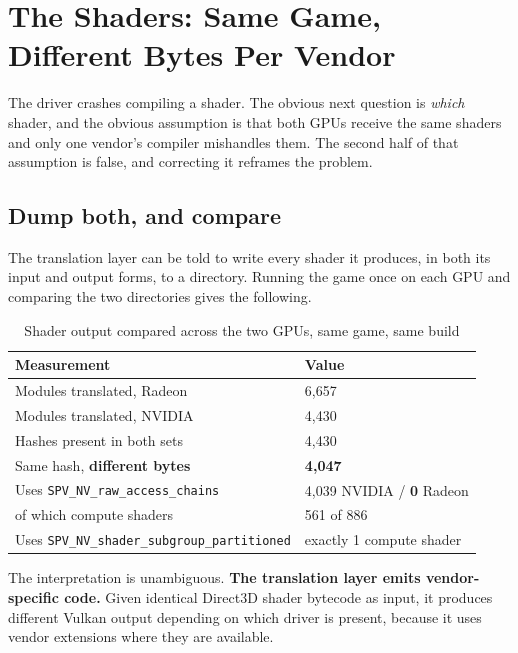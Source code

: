 \section{The Shaders: Same Game, Different Bytes Per Vendor}
\label{sec:shaders}

The driver crashes compiling a shader. The obvious next question is \emph{which}
shader, and the obvious assumption is that both GPUs receive the same shaders and
only one vendor's compiler mishandles them. The second half of that assumption is
false, and correcting it reframes the problem.

\subsection{Dump both, and compare}

The translation layer can be told to write every shader it produces, in both its
input and output forms, to a directory. Running the game once on each GPU and
comparing the two directories gives the following.

\begin{table}[htbp]
\caption{Shader output compared across the two GPUs, same game, same build}
\label{tab:shaders}
\centering
\footnotesize
\begin{tabularx}{\columnwidth}{@{}L{4.4cm}X@{}}
\toprule
\textbf{Measurement} & \textbf{Value} \\
\midrule
Modules translated, Radeon & 6{,}657 \\
Modules translated, NVIDIA & 4{,}430 \\
Hashes present in both sets & 4{,}430 \\
Same hash, \textbf{different bytes} & \textbf{4{,}047} \\
Uses \verb|SPV_NV_raw_access_chains| & 4{,}039 NVIDIA / \textbf{0} Radeon \\
\quad of which compute shaders & 561 of 886 \\
Uses \verb|SPV_NV_shader_|\linebreak\verb|subgroup_partitioned| & exactly 1
                                                                 compute shader \\
\bottomrule
\end{tabularx}
\end{table}

The interpretation is unambiguous. \textbf{The translation layer emits
vendor-specific code.} Given identical Direct3D shader bytecode as input, it
produces different Vulkan output depending on which driver is present, because it
uses vendor extensions where they are available.

